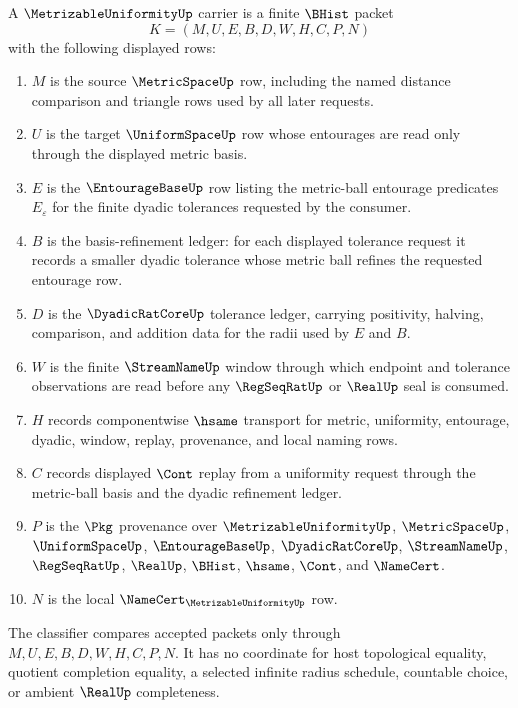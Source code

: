 \begin{definition}
\label{def:metrizable-uniformity-carrier}
A $\MetrizableUniformityUp$ carrier is a finite $\BHist$ packet
$$
K=(M,U,E,B,D,W,H,C,P,N)
$$
with the following displayed rows:
\begin{enumerate}
\item $M$ is the source $\MetricSpaceUp$ row, including the named distance comparison and triangle rows used by all later requests.
\item $U$ is the target $\UniformSpaceUp$ row whose entourages are read only through the displayed metric basis.
\item $E$ is the $\EntourageBaseUp$ row listing the metric-ball entourage predicates $E_\varepsilon$ for the finite dyadic tolerances requested by the consumer.
\item $B$ is the basis-refinement ledger: for each displayed tolerance request it records a smaller dyadic tolerance whose metric ball refines the requested entourage row.
\item $D$ is the $\DyadicRatCoreUp$ tolerance ledger, carrying positivity, halving, comparison, and addition data for the radii used by $E$ and $B$.
\item $W$ is the finite $\StreamNameUp$ window through which endpoint and tolerance observations are read before any $\RegSeqRatUp$ or $\RealUp$ seal is consumed.
\item $H$ records componentwise $\hsame$ transport for metric, uniformity, entourage, dyadic, window, replay, provenance, and local naming rows.
\item $C$ records displayed $\Cont$ replay from a uniformity request through the metric-ball basis and the dyadic refinement ledger.
\item $P$ is the $\Pkg$ provenance over $\MetrizableUniformityUp$, $\MetricSpaceUp$, $\UniformSpaceUp$, $\EntourageBaseUp$, $\DyadicRatCoreUp$, $\StreamNameUp$, $\RegSeqRatUp$, $\RealUp$, $\BHist$, $\hsame$, $\Cont$, and $\NameCert$.
\item $N$ is the local $\NameCert_{\MetrizableUniformityUp}$ row.
\end{enumerate}
The classifier compares accepted packets only through $M,U,E,B,D,W,H,C,P,N$. It has no coordinate for host topological equality, quotient completion equality, a selected infinite radius schedule, countable choice, or ambient $\RealUp$ completeness.
\end{definition}

